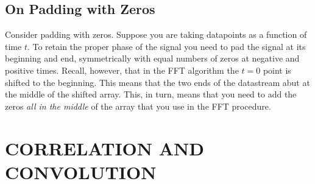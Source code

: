 \documentclass[psfig,preprint]{aastex}
\begin{document}
\subsection{On Padding with Zeros} \label{padding}

	Consider padding with zeros. Suppose you are taking datapoints
as a function of time $t$. To retain the proper phase of the signal you
need to pad the signal at its beginning and end, symmetrically with
equal numbers of zeros at negative and positive times. Recall, however,
that in the FFT algorithm the $t=0$ point is shifted to the beginning.
This means that the two ends of the datastream abut at the middle of the
shifted array. This, in turn, means that you need to add the zeros {\it
all in the middle} of the array that you use in the FFT procedure.

\section{CORRELATION AND CONVOLUTION}  
\end{document}
